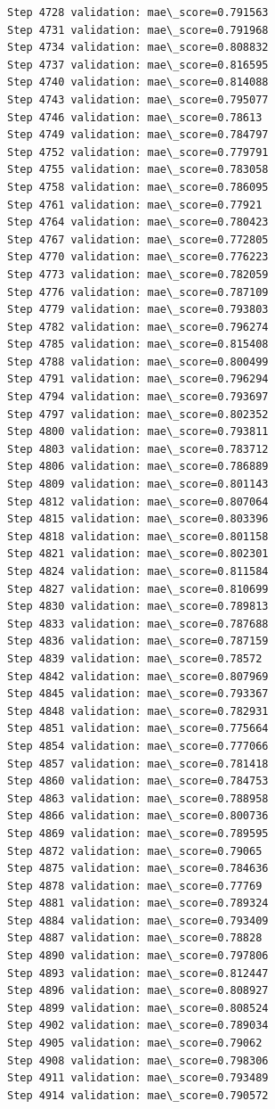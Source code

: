 \documentclass[11pt]{article}
\begin{document}
\begin{Verbatim}[commandchars=\\\{\}]
Step 4728 validation: mae\_score=0.791563
Step 4731 validation: mae\_score=0.791968
Step 4734 validation: mae\_score=0.808832
Step 4737 validation: mae\_score=0.816595
Step 4740 validation: mae\_score=0.814088
Step 4743 validation: mae\_score=0.795077
Step 4746 validation: mae\_score=0.78613
Step 4749 validation: mae\_score=0.784797
Step 4752 validation: mae\_score=0.779791
Step 4755 validation: mae\_score=0.783058
Step 4758 validation: mae\_score=0.786095
Step 4761 validation: mae\_score=0.77921
Step 4764 validation: mae\_score=0.780423
Step 4767 validation: mae\_score=0.772805
Step 4770 validation: mae\_score=0.776223
Step 4773 validation: mae\_score=0.782059
Step 4776 validation: mae\_score=0.787109
Step 4779 validation: mae\_score=0.793803
Step 4782 validation: mae\_score=0.796274
Step 4785 validation: mae\_score=0.815408
Step 4788 validation: mae\_score=0.800499
Step 4791 validation: mae\_score=0.796294
Step 4794 validation: mae\_score=0.793697
Step 4797 validation: mae\_score=0.802352
Step 4800 validation: mae\_score=0.793811
Step 4803 validation: mae\_score=0.783712
Step 4806 validation: mae\_score=0.786889
Step 4809 validation: mae\_score=0.801143
Step 4812 validation: mae\_score=0.807064
Step 4815 validation: mae\_score=0.803396
Step 4818 validation: mae\_score=0.801158
Step 4821 validation: mae\_score=0.802301
Step 4824 validation: mae\_score=0.811584
Step 4827 validation: mae\_score=0.810699
Step 4830 validation: mae\_score=0.789813
Step 4833 validation: mae\_score=0.787688
Step 4836 validation: mae\_score=0.787159
Step 4839 validation: mae\_score=0.78572
Step 4842 validation: mae\_score=0.807969
Step 4845 validation: mae\_score=0.793367
Step 4848 validation: mae\_score=0.782931
Step 4851 validation: mae\_score=0.775664
Step 4854 validation: mae\_score=0.777066
Step 4857 validation: mae\_score=0.781418
Step 4860 validation: mae\_score=0.784753
Step 4863 validation: mae\_score=0.788958
Step 4866 validation: mae\_score=0.800736
Step 4869 validation: mae\_score=0.789595
Step 4872 validation: mae\_score=0.79065
Step 4875 validation: mae\_score=0.784636
Step 4878 validation: mae\_score=0.77769
Step 4881 validation: mae\_score=0.789324
Step 4884 validation: mae\_score=0.793409
Step 4887 validation: mae\_score=0.78828
Step 4890 validation: mae\_score=0.797806
Step 4893 validation: mae\_score=0.812447
Step 4896 validation: mae\_score=0.808927
Step 4899 validation: mae\_score=0.808524
Step 4902 validation: mae\_score=0.789034
Step 4905 validation: mae\_score=0.79062
Step 4908 validation: mae\_score=0.798306
Step 4911 validation: mae\_score=0.793489
Step 4914 validation: mae\_score=0.790572

\end{Verbatim}
\end{document}
